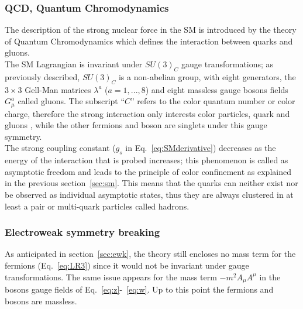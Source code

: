 \subsubsection{QCD, Quantum Chromodynamics}
The description of the strong nuclear force in the SM is introduced by the theory of Quantum Chromodynamics which defines the interaction between quarks and gluons.\\
The SM Lagrangian is invariant under $SU(3)_C$ gauge transformations; as previously described, $SU(3)_C$ is a non-abelian group, with eight generators, the $3\times3$ Gell-Man matrices $\lambda^a$ ($a = 1,...,8$) and eight massless gauge bosons fields $G^a_{\mu}$ called gluons. The subscript ``$C$'' refers to the color quantum number or color charge, therefore the strong interaction only interests color particles, quark and gluons , while the other fermions and boson are singlets under this gauge symmetry. \\ 
The strong coupling constant ($g_s$ in Eq.~\ref{eq:SMderivative}) decreases as the energy of the interaction that is probed increases; this phenomenon is called as asymptotic freedom and leads to the principle of color confinement as explained in the previous section~\ref{sec:sm}. This means that the quarks can neither exist nor be observed as individual asymptotic states, thus they are always clustered in at least a pair or multi-quark particles called hadrons.


\subsubsection{Electroweak symmetry breaking}\label{sec:symBreaking}
As anticipated in section~\ref{sec:ewk}, the theory still encloses no mass term for the fermions (Eq.~\ref{eq:LR3}) since it would not be invariant under gauge transformations. The same issue appears for the mass term $-m^2A_{\mu}A^{\mu}$ in the bosons gauge fields of Eq.~\ref{eq:z}-~\ref{eq:w}. Up to this point the fermions and bosons are massless.

